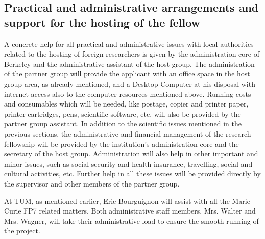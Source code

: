 \subsection{Practical and administrative arrangements and support for the hosting of the fellow 
} 
A concrete help for all practical and administrative issues with local authorities related to 
the hosting of foreign researchers is given by the administration core of Berkeley and the 
administrative assistant of the host group. The administration of the partner group will 
provide the applicant with an office space in the host group area, as already mentioned, 
and a Desktop Computer at his disposal with internet access also to the computer 
resources mentioned above. Running costs and consumables which will be needed, like 
postage, copier and printer paper, printer cartridges, pens, scientific software, etc. will 
also be provided by the partner group assistant. 
In addition to the scientific issues mentioned in the previous sections, the administrative 
and financial management of the research fellowship will be provided by the institution's 
administration core and the secretary of the host group. Administration will also help in 
other important and minor issues, such as social security and health insurance, travelling, 
social and cultural activities, etc. Further help in all these issues will be provided directly 
by the supervisor and other members of the partner group.

At TUM, as mentioned earlier, Eric Bourguignon  will assist with all the
Marie Curie FP7 related matters. Both  administrative staff members, Mrs. Walter and
Mrs. Wagner, will take their administrative load  to ensure the smooth running of the
project.
\newpage
